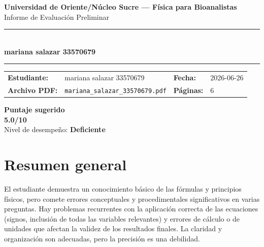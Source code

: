 \documentclass[11pt,a4paper]{article}
\begin{document}
\begin{center}
  {\Large\bfseries\color{azulTitulo} Universidad de Oriente/Núcleo Sucre --- Física para Bioanalistas}\\[4pt]
  {\large Informe de Evaluación Preliminar}\\[12pt]
  \rule{\linewidth}{1.2pt}\\[6pt]
  {\LARGE\bfseries mariana salazar 33570679}\\[4pt]
  \rule{\linewidth}{0.6pt}
\end{center}

\vspace{4pt}
\begin{tcolorbox}[cajaTitulo, title=Datos del informe]
\begin{tabular}{@{}llll@{}}
  \textbf{Estudiante:}  & mariana salazar 33570679  &
  \textbf{Fecha:}       & 2026-06-26 \\[4pt]
  \textbf{Archivo PDF:} & \texttt{mariana\_salazar\_33570679.pdf}  &
  \textbf{Páginas:}     & 6 \\
\end{tabular}
\end{tcolorbox}

\vspace{6pt}
\begin{center}
  \begin{tcolorbox}[
    enhanced,
    colback=white, colframe=desempeno_deficiente,
    width=0.62\linewidth,
    boxrule=2pt,
    halign=center, valign=center,
    top=8pt, bottom=8pt,
  ]
    \centering
    {\large\bfseries Puntaje sugerido}\\[6pt]
    {\Huge\bfseries\color{desempeno_deficiente} 5.0/10}\\[6pt]
    {\large Nivel de desempeño: \textbf{\color{desempeno_deficiente} Deficiente}}
  \end{tcolorbox}
\end{center}

\section*{Resumen general}
El estudiante demuestra un conocimiento básico de las fórmulas y principios físicos, pero comete errores conceptuales y procedimentales significativos en varias preguntas. Hay problemas recurrentes con la aplicación correcta de las ecuaciones (signos, inclusión de todas las variables relevantes) y errores de cálculo o de unidades que afectan la validez de los resultados finales. La claridad y organización son adecuadas, pero la precisión es una debilidad.
\end{document}
